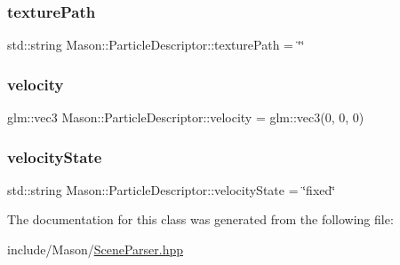 \hypertarget{class_mason_1_1_particle_descriptor_a060bb2c95075b3a19432beca816bfa76}{}\label{class_mason_1_1_particle_descriptor_a060bb2c95075b3a19432beca816bfa76} 
\subsubsection{\texorpdfstring{texture\+Path}{texturePath}}
{\footnotesize\ttfamily std\+::string Mason\+::\+Particle\+Descriptor\+::texture\+Path = \char`\"{}\char`\"{}}

\hypertarget{class_mason_1_1_particle_descriptor_a015f949d8089667eea16540fb750f70a}{}\label{class_mason_1_1_particle_descriptor_a015f949d8089667eea16540fb750f70a} 
\subsubsection{\texorpdfstring{velocity}{velocity}}
{\footnotesize\ttfamily glm\+::vec3 Mason\+::\+Particle\+Descriptor\+::velocity = glm\+::vec3(0, 0, 0)}

\hypertarget{class_mason_1_1_particle_descriptor_ac84b802189304538944403fdff16faf2}{}\label{class_mason_1_1_particle_descriptor_ac84b802189304538944403fdff16faf2} 
\subsubsection{\texorpdfstring{velocity\+State}{velocityState}}
{\footnotesize\ttfamily std\+::string Mason\+::\+Particle\+Descriptor\+::velocity\+State = \char`\"{}fixed\char`\"{}}



The documentation for this class was generated from the following file\+:\begin{DoxyCompactItemize}
\item 
include/\+Mason/\hyperlink{_scene_parser_8hpp}{Scene\+Parser.\+hpp}\end{DoxyCompactItemize}
